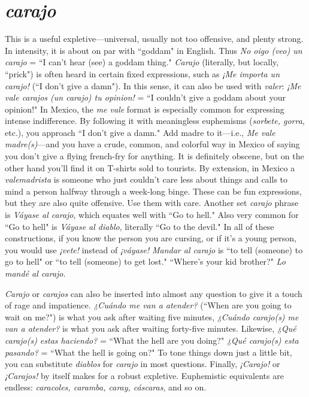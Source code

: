\section{\emph{carajo}}

This is a useful expletive---universal, usually not too offensive, and plenty strong. In intensity, it is about on par with ``goddam"
in English. Thus \emph{No oigo (veo) un carajo} = ``I can't hear (see) a goddam thing." \emph{Carajo} (literally, but locally, ``prick") is often heard in certain fixed expressions, such as \emph{¡Me importa un carajo!} (``I don't give a
damn"). In this sense, it can also be used with \emph{valer}: \emph{¡Me vale carajos
(un carajo) tu opinion!} = ``I couldn't give a goddam about your
opinion!"
In Mexico, the \emph{me vale} format is especially common for expressing intense indifference. By following it with meaningless euphemisms (\emph{sorbete, gorra}, etc.), you approach ``I don't give a damn." Add
madre to it---i.e., \emph{Me vale madre(s)}---and you have a crude, common,
and colorful way in Mexico of saying you don't give a flying french-fry
for anything. It is definitely obscene, but on the other hand you'll find
it on T-shirts sold to tourists. By extension, in Mexico a \emph{valemadrista}
is someone who just couldn't care less about things and calls to mind
a person halfway through a week-long binge. These can be fun expressions, but they are also quite offensive. Use them with care.
Another set \emph{carajo} phrase is \emph{Váyase al carajo}, which equates
well with ``Go to hell." Also very common for ``Go to hell" is \emph{Váyase
al diablo}, literally ``Go to the devil." In all of these constructions, if
you know the person you are cursing, or if it's a young person, you
would use \emph{¡vete!} instead of \emph{¡váyase!} \emph{Mandar al carajo} is ``to tell (someone) to go to hell" or ``to tell (someone) to get lost." ``Where's your kid
brother?" \emph{Lo mandé al carajo}.

\emph{Carajo} or \emph{carajos} can also be inserted into almost any
question to give it a touch of rage and impatience. \emph{¿Cuándo me van a atender?} (``When are you going to wait on me?") is what you ask after waiting five minutes, \emph{¿Cuándo carajo(s) me van a atender?} is what you ask
after waiting forty-five minutes. Likewise, \emph{¿Qué carajo(s) estas haciendo?} = ``What the hell are you doing?" \emph{¿Qué carajo(s) esta pasando?}
= ``What the hell is going on?" To tone things down just a little bit,
you can substitute \emph{diablos} for \emph{carajo} in most questions.
Finally, \emph{¡Carajo!} or \emph{¡Carajos!} by itself makes for a robust expletive. Euphemistic equivalents are endless: \emph{caracoles, caramba,
caray, cáscaras}, and so on.

